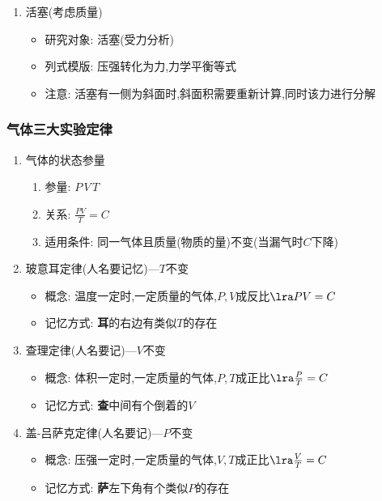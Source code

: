 \documentclass{article}
\begin{document}
\begin{enumerate}
\begin{enumerate}[label = (\arabic*)]
\begin{itemize}
                    \end{itemize}
              \item 活塞(考虑质量)
                    \begin{itemize}
                        \item 研究对象: 活塞(受力分析)
                        \item 列式模版: 压强转化为力,力学平衡等式
                        \item 注意: 活塞有一侧为斜面时,斜面积需要重新计算,同时该力进行分解
                    \end{itemize}
          \end{enumerate}
\end{enumerate}

\vspace{1em}

\subsubsection{气体三大实验定律}
\begin{enumerate}[label = \arabic*]
    \item 气体的状态参量
          \begin{enumerate}[label = (\arabic*)]
              \item 参量: $P \, V \, T$
              \item 关系: $\frac{PV}{T} = C$
              \item 适用条件: 同一气体且质量(物质的量)不变(当漏气时$C$下降)
          \end{enumerate}
    \item 玻意耳定律(人名要记忆)---$T$不变
          \begin{itemize}
              \item 概念: 温度一定时,一定质量的气体,$P,V$成反比$\lra PV = C$
              \item 记忆方式: \textbf{耳}的右边有类似$T$的存在
          \end{itemize}
    \item 查理定律(人名要记)---$V$不变
          \begin{itemize}
              \item 概念: 体积一定时,一定质量的气体,$P,T$成正比$\lra \frac{P}{T} = C$
              \item 记忆方式: \textbf{查}中间有个倒着的$V$
          \end{itemize}
    \item 盖-吕萨克定律(人名要记)---$P$不变
          \begin{itemize}
              \item 概念: 压强一定时,一定质量的气体,$V,T$成正比$\lra \frac{V}{T} = C$
              \item 记忆方式: \textbf{萨}左下角有个类似$P$的存在
          \end{itemize}
\end{enumerate}
\end{document}
